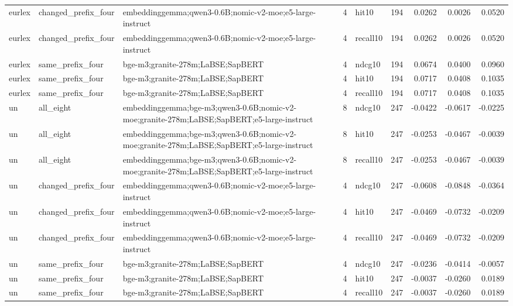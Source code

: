 \begin{tabular}{lllrlrrrr}
eurlex & changed\_prefix\_four & embeddinggemma;qwen3-0.6B;nomic-v2-moe;e5-large-instruct & 4 & hit10 & 194 & 0.0262 & 0.0026 & 0.0520 \\
eurlex & changed\_prefix\_four & embeddinggemma;qwen3-0.6B;nomic-v2-moe;e5-large-instruct & 4 & recall10 & 194 & 0.0262 & 0.0026 & 0.0520 \\
eurlex & same\_prefix\_four & bge-m3;granite-278m;LaBSE;SapBERT & 4 & ndcg10 & 194 & 0.0674 & 0.0400 & 0.0960 \\
eurlex & same\_prefix\_four & bge-m3;granite-278m;LaBSE;SapBERT & 4 & hit10 & 194 & 0.0717 & 0.0408 & 0.1035 \\
eurlex & same\_prefix\_four & bge-m3;granite-278m;LaBSE;SapBERT & 4 & recall10 & 194 & 0.0717 & 0.0408 & 0.1035 \\
un & all\_eight & embeddinggemma;bge-m3;qwen3-0.6B;nomic-v2-moe;granite-278m;LaBSE;SapBERT;e5-large-instruct & 8 & ndcg10 & 247 & -0.0422 & -0.0617 & -0.0225 \\
un & all\_eight & embeddinggemma;bge-m3;qwen3-0.6B;nomic-v2-moe;granite-278m;LaBSE;SapBERT;e5-large-instruct & 8 & hit10 & 247 & -0.0253 & -0.0467 & -0.0039 \\
un & all\_eight & embeddinggemma;bge-m3;qwen3-0.6B;nomic-v2-moe;granite-278m;LaBSE;SapBERT;e5-large-instruct & 8 & recall10 & 247 & -0.0253 & -0.0467 & -0.0039 \\
un & changed\_prefix\_four & embeddinggemma;qwen3-0.6B;nomic-v2-moe;e5-large-instruct & 4 & ndcg10 & 247 & -0.0608 & -0.0848 & -0.0364 \\
un & changed\_prefix\_four & embeddinggemma;qwen3-0.6B;nomic-v2-moe;e5-large-instruct & 4 & hit10 & 247 & -0.0469 & -0.0732 & -0.0209 \\
un & changed\_prefix\_four & embeddinggemma;qwen3-0.6B;nomic-v2-moe;e5-large-instruct & 4 & recall10 & 247 & -0.0469 & -0.0732 & -0.0209 \\
un & same\_prefix\_four & bge-m3;granite-278m;LaBSE;SapBERT & 4 & ndcg10 & 247 & -0.0236 & -0.0414 & -0.0057 \\
un & same\_prefix\_four & bge-m3;granite-278m;LaBSE;SapBERT & 4 & hit10 & 247 & -0.0037 & -0.0260 & 0.0189 \\
un & same\_prefix\_four & bge-m3;granite-278m;LaBSE;SapBERT & 4 & recall10 & 247 & -0.0037 & -0.0260 & 0.0189 \\
\bottomrule
\end{tabular}

